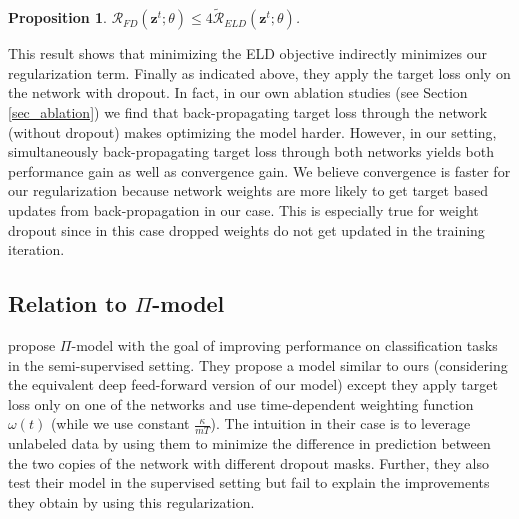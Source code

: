 \documentclass{article} %
\newtheorem{proposition}{Proposition}
\begin{document}
\begin{proposition}
\label{prop_eld}
$\mathcal{R}_{FD}(\mathbf{z}^{t}; \theta) \leq 4 \mathcal{\tilde{R}}_{ELD}(\mathbf{z}^{t}; \theta)$.
\end{proposition}
This result shows that minimizing the ELD objective indirectly minimizes our regularization term.
Finally as indicated above, they apply the target loss only on the network with dropout. In fact, in our own ablation studies (see Section \ref{sec_ablation}) we find that back-propagating target loss through the network (without dropout) makes optimizing the model harder. However, in our setting, simultaneously back-propagating target loss through both networks yields both performance gain as well as convergence gain. We believe convergence is faster for our regularization because network weights are more likely to get target based updates from back-propagation in our case. This is especially true for weight dropout \citep{wan2013regularization} since in this case dropped weights do not get updated in the training iteration.

\subsection{Relation to \texorpdfstring{$\Pi$}{TEXT}-model}

\citet{laine2016temporal} propose $\Pi$-model with the goal of improving performance on classification tasks in the semi-supervised setting. They propose a model similar to ours (considering the equivalent deep feed-forward version of our model) except they apply target loss only on one of the networks and use time-dependent weighting function $\omega(t)$ (while we use constant $\frac{\kappa}{mT}$). The intuition in their case is to leverage unlabeled data by using them to minimize the difference in prediction between the two copies of the network with different dropout masks. Further, they also test their model in the supervised setting but fail to explain the improvements they obtain by using this regularization.
\end{document}
